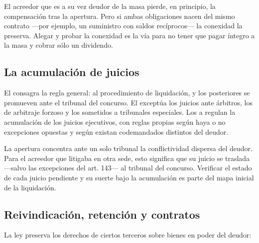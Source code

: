 \begin{practica}
El acreedor que es a su vez deudor de la masa pierde, en principio, la compensación tras la
apertura. Pero si ambas obligaciones nacen del mismo contrato ---por ejemplo, un suministro con
saldos recíprocos--- la conexidad la preserva. Alegar y probar la conexidad es la vía para no
tener que pagar íntegro a la masa y cobrar sólo un dividendo.
\end{practica}

\subsection{La acumulación de juicios}

El  consagra la regla general:  al procedimiento de liquidación, y los posteriores se promueven ante el
tribunal del concurso. El  exceptúa los juicios ante árbitros, los de arbitraje forzoso
y los sometidos a tribunales especiales. Los  a  regulan la acumulación de los
juicios ejecutivos, con reglas propias según haya o no excepciones opuestas y según existan
codemandados distintos del deudor.

\begin{foco}
La apertura concentra ante un solo tribunal la conflictividad dispersa del deudor. Para el
acreedor que litigaba en otra sede, esto significa que su juicio se traslada ---salvo las
excepciones del art. 143--- al tribunal del concurso. Verificar el estado de cada juicio
pendiente y su suerte bajo la acumulación es parte del mapa inicial de la liquidación.
\end{foco}

\subsection{Reivindicación, retención y contratos}

La ley preserva los derechos de ciertos terceros sobre bienes en poder del deudor:

